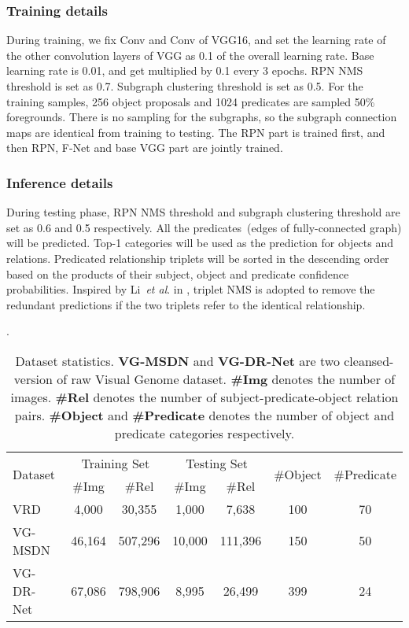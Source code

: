 \documentclass[runningheads]{llncs}
\newcommand{\etal}{\textit{et al}. }
\begin{document}
\subsubsection{Training details} 
During training, we fix Conv and Conv of VGG16, and set the learning rate of the other convolution layers of VGG as 0.1 of the overall learning rate. Base learning rate is 0.01,  and get multiplied by 0.1 every 3 epochs. RPN NMS threshold is set as 0.7. Subgraph clustering threshold is set as 0.5. For the training samples, 256 object proposals and 1024 predicates are sampled 50\% foregrounds. There is no sampling for the subgraphs, so the subgraph connection maps are identical from training to testing. The RPN part is trained first, and then RPN, F-Net and base VGG part are jointly trained. 

\subsubsection{Inference details}
During testing phase, RPN NMS threshold and subgraph clustering threshold are set as 0.6 and 0.5 respectively. All the predicates~(edges of fully-connected graph) will be predicted. Top-1 categories will be used as the prediction for objects and relations.  Predicated relationship triplets will be sorted in the descending order based on the products of their subject, object and predicate confidence probabilities. Inspired by Li~\etal in \cite{li2017vip}, triplet NMS is adopted to remove the redundant predictions if the two triplets refer to the identical relationship. \begin{table*}[t]
	\renewcommand{\arraystretch}{1.1}
	\setlength{\tabcolsep}{3.8pt}
	\small
	\caption{Dataset statistics. \textbf{VG-MSDN} and \textbf{VG-DR-Net} are two cleansed-version of raw Visual Genome dataset. \textbf{\#Img} denotes the number of images. \textbf{\#Rel} denotes the number of subject-predicate-object relation pairs. \textbf{\#Object} and \textbf{\#Predicate} denotes the number of object and predicate categories respectively. }.
	\begin{center}
	\begin{tabular}{l|cc | cc | c|c}
	\hline
	\multirow{2}{*}{Dataset} & \multicolumn{2}{c}{Training Set} \vline & \multicolumn{2}{c}{Testing Set}\vline & \multirow{2}{*}{\#Object} & \multirow{2}{*}{\#Predicate	} \\
	& \#Img & \#Rel & \#Img & \#Rel & \\\hline
	VRD~\cite{visual_relationship} & 4,000 & 30,355 & 1,000 & 7,638 & 100 & 70 \\
	VG-MSDN~\cite{li2017scene,visual_genome} & 46,164 & 507,296 & 10,000 & 111,396 & 150 & 50 \\
	VG-DR-Net~\cite{dai2017detecting,visual_genome} & 67,086 & 798,906 & 8,995 & 26,499 & 399 & 24\\
	\hline
	\end{tabular}
	\end{center}
	\label{tab:dataset}
\end{table*}
\end{document}
